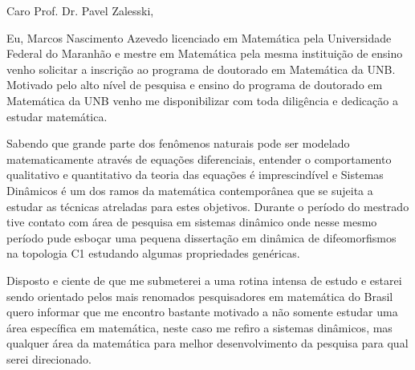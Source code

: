 \documentclass[11pt]{article}
\begin{document}
Caro Prof. Dr. Pavel Zalesski,

Eu, Marcos Nascimento Azevedo licenciado em Matemática pela Universidade Federal do Maranhão e mestre em Matemática pela mesma instituição de ensino venho solicitar a inscrição ao programa de doutorado em Matemática da UNB.
Motivado pelo alto nível de pesquisa e ensino do programa de doutorado em Matemática da UNB venho me disponibilizar com toda diligência e dedicação a estudar matemática.

Sabendo que grande parte dos fenômenos naturais pode ser modelado matematicamente através de equações diferenciais, entender o comportamento qualitativo e quantitativo da teoria das equações é imprescindível e Sistemas Dinâmicos é um dos ramos da matemática contemporânea que se sujeita a estudar as técnicas atreladas para estes objetivos. Durante o período do mestrado tive contato com área de pesquisa em sistemas dinâmico onde nesse mesmo período pude esboçar uma pequena dissertação em dinâmica de difeomorfismos na topologia C1 estudando algumas propriedades genéricas.

Disposto e ciente de que me submeterei a uma rotina intensa de estudo e estarei sendo orientado pelos mais renomados pesquisadores em matemática do Brasil quero informar que me encontro bastante motivado a não somente estudar uma área específica em matemática, neste caso me refiro a sistemas dinâmicos, mas qualquer área da matemática para melhor desenvolvimento da pesquisa para qual serei direcionado.
\end{document}
